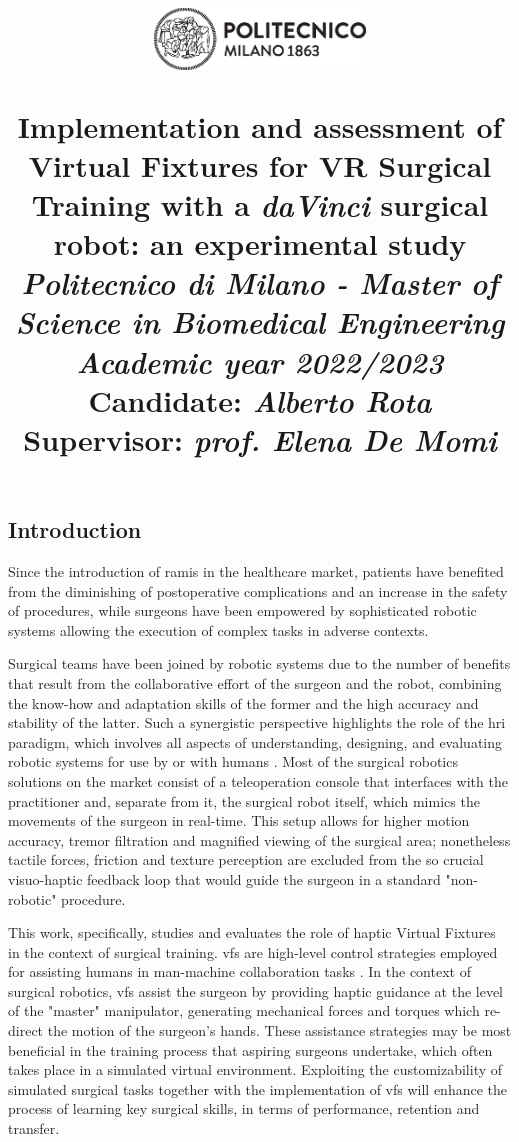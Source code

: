\documentclass{article}
\title{
\begin{figure}[h!]
\centering
\includegraphics[width=0.5\textwidth]{images/logo_polimi_scritta2.eps}
\end{figure}
\textbf{Implementation and assessment of Virtual Fixtures for VR Surgical Training with a \textit{daVinci} surgical robot: an experimental study}
\\
\vspace{0.5cm}\large{\textit{Politecnico di Milano - Master of Science in Biomedical Engineering}}
\\
\vspace{0.5cm}\textit{\small{Academic year 2022/2023}}\vspace{0.5cm}\\
{\large \textbf{Candidate: \textit{Alberto Rota}}\\
\textbf{Supervisor: \textit{prof. Elena De Momi}}}}
\author{}
\date{}
\begin{document}
\maketitle

\begin{multicols}{2}


\section{Introduction}
Since the introduction of \ac{ramis} in the healthcare market, patients have benefited from the diminishing of postoperative complications and an increase in the safety of procedures, while surgeons have been empowered by sophisticated robotic systems allowing the execution of complex tasks in adverse contexts. 

Surgical teams have been joined by robotic systems due to the number of benefits that result from the collaborative effort of the surgeon and the robot, combining the know-how and adaptation skills of the former and the high accuracy and stability of the latter. Such a synergistic perspective highlights the role of the \ac{hri} paradigm, which involves all aspects of understanding, designing, and evaluating robotic systems for use by or with humans \cite{Goodrich2007}. Most of the surgical robotics solutions on the market consist of a teleoperation console that interfaces with the practitioner and, separate from it, the surgical robot itself, which mimics the movements of the surgeon in real-time. This setup allows for higher motion accuracy, tremor filtration and magnified viewing of the surgical area; nonetheless tactile forces, friction and texture perception are excluded from the so crucial visuo-haptic feedback loop that would guide the surgeon in a standard "non-robotic" procedure.

This work, specifically, studies and evaluates the role of haptic Virtual Fixtures in the context of surgical training. \acp{vf} are high-level control strategies employed for assisting humans in man-machine collaboration tasks \cite{Bowyer2014}. In the context of surgical robotics, \acp{vf} assist the surgeon by providing haptic guidance at the level of the "master" manipulator, generating mechanical forces and torques which re-direct the motion of the surgeon's hands. These assistance strategies may be most beneficial in the training process that aspiring surgeons undertake, which often takes place in a simulated virtual environment. Exploiting the customizability of simulated surgical tasks together with the implementation of \acp{vf} will enhance the process of learning key surgical skills, in terms of performance, retention and transfer.




\end{multicols}
\end{document}
